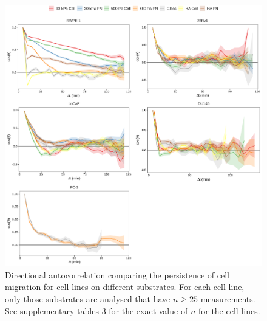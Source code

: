 \documentclass[11pt,letterpaper,english,oneside]{article} %
\begin{document}
\begin{figure}[H]
    \hspace*{-0.8cm}
    \centering
    \includegraphics{../Figures/Supplementary_Figures17_21/supplementary_figure18.png}
    \caption{Directional autocorrelation comparing the persistence of cell migration for cell lines on different substrates.
    For each cell line, only those substrates are analysed that have $n \geq 25$ measurements.
    See supplementary tables 3 for the exact value of $n$ for the cell lines.}
    \label{fig:fig18}
\end{figure}
\end{document}
